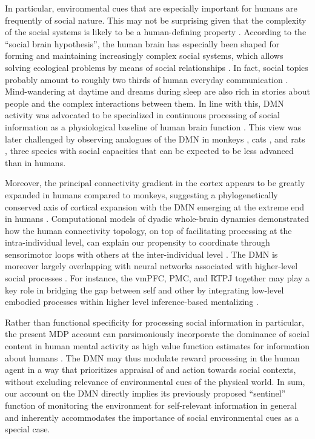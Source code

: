 \documentclass[10pt,letterpaper]{article}
\begin{document}
In particular,
environmental cues that are especially important for humans are frequently of
social nature. This may not be surprising
given that
the complexity of the social systems
is likely to be a human-defining property
\citep{tomasello2009cultural, dunbar2007science}.
According to the ``social brain hypothesis'',
the human brain has especially been shaped for
forming and maintaining increasingly complex
social systems,
which allows solving ecological problems by means of social relationships
\citep{whiten1988machiavellian}.
In fact, social topics probably amount to roughly
two thirds of human everyday communication \citep{dunbar1997human}.
Mind-wandering at daytime and dreams during sleep
are also rich in stories about people and
the complex interactions between them.
%
In line with this, DMN activity was advocated to be specialized in
continuous processing of social information as a
physiological baseline of human brain function
\citep{schilbach2008minds}. This view was later challenged by observing
analogues of the DMN in monkeys \citep{mantini2011default},
cats \citep{popa2009contrasting},
and rats \citep{lu2012rat}, three species with
social capacities that can be expected to be less advanced than in humans.


Moreover,
the principal connectivity gradient in the cortex appears to be greatly expanded in humans compared to monkeys, suggesting a phylogenetically conserved axis of cortical expansion with the DMN emerging at the extreme end in humans \citep{margulies_situating_2016}. Computational models of dyadic whole-brain dynamics
demonstrated how the human connectivity topology, on top of facilitating processing at the intra-individual level, can explain our propensity to coordinate through sensorimotor loops with others at the inter-individual level \citep{dumas_anatomical_2012}.
The DMN is moreover largely overlapping with neural networks associated with higher-level social processes \citep{schilbach_introspective_2012}. For instance, the vmPFC,
PMC, and RTPJ
together may play a key role in bridging the gap between self and other by
integrating low-level embodied processes within higher level inference-based mentalizing
\citep{lombardo_shared_2009, social_brain_atlas}.


Rather than functional specificity for processing social information in particular,
the present MDP account can parsimoniously incorporate
the dominance of social content in
human mental activity
as high value function estimates for information about humans
\citep{baker2009action, kampe2001psychology, krienen2010clan}.
The DMN may thus modulate reward processing
in the human agent in a way that prioritizes
appraisal of and action towards social contexts,
without excluding relevance of environmental cues of the physical world.
In sum,
our account on the DMN directly implies
its previously proposed ``sentinel'' function
of monitoring the environment for self-relevant information
in general and
inherently accommodates the importance of social environmental cues
as a special case.
\end{document}
